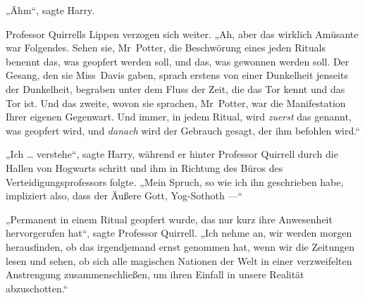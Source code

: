 „Ähm“, sagte Harry.

Professor Quirrells Lippen verzogen sich weiter.
„Ah, aber das wirklich Amüsante war Folgendes. Sehen sie, Mr~Potter, die Beschwörung eines jeden Rituals benennt das, was geopfert werden soll, und das, was gewonnen werden soll. Der Gesang, den sie Miss~Davis gaben, sprach erstens von einer Dunkelheit jenseits der Dunkelheit, begraben unter dem Fluss der Zeit, die das Tor kennt und das Tor ist. Und das zweite, wovon sie sprachen, Mr~Potter, war die Manifestation Ihrer eigenen Gegenwart. Und immer, in jedem Ritual, wird \emph{zuerst} das genannt, was geopfert wird, und \emph{danach} wird der Gebrauch gesagt, der ihm befohlen wird.“

„Ich … verstehe“, sagte Harry, während er hinter Professor Quirrell durch die Hallen von Hogwarts schritt und ihm in Richtung des Büros des Verteidigungsprofessors folgte.
„Mein Spruch, so wie ich ihn geschrieben habe, impliziert also, dass der Äußere Gott, Yog-Sothoth —“

„Permanent in einem Ritual geopfert wurde, das nur kurz ihre Anwesenheit hervorgerufen hat“, sagte Professor Quirrell.
„Ich nehme an, wir werden morgen herausfinden, ob das irgendjemand ernst genommen hat, wenn wir die Zeitungen lesen und sehen, ob sich alle magischen Nationen der Welt in einer verzweifelten Anstrengung zusammenschließen, um ihren Einfall in unsere Realität abzuschotten.“

